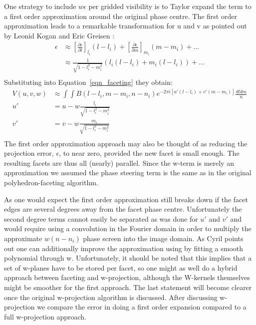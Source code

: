 One strategy to include $w\epsilon$ per gridded visibility is to Taylor expand the term to a first order approximation around the original phase centre. The 
first order approximation leads to a remarkable transformation for u and v as pointed out by Leonid Kogan and Eric Greisen \cite{aipsfaceting}:
\begin{equation}
 \begin{split}
  \epsilon&\approx \left[\frac{\partial \epsilon}{\partial l}\right]_{l_i}(l - l_i) + \left[\frac{\partial \epsilon}{\partial m}\right]_{m_i}(m - m_i) + \dots\\
  &\approx \frac{1}{\sqrt{1-l_i^2-m_i^2}}(l_i(l - l_i) + m_i(l - l_i)) + \dots\\
 \end{split}
\end{equation}
Substituting into Equation~\ref{eqn_faceting} they obtain:
\begin{equation}
 \begin{split}
  V(u,v,w)&\approx\int{\int{B(l-l_i,m-m_i,n-n_i)e^{-2{\pi}i[u'(l-l_i)+v'(m-m_i)]}\frac{dldm}{n}}}\\
  u'&=u - w\frac{l_i}{\sqrt{1-l_i^2-m_i^2}}\\
  v'&=v - w\frac{m_i}{\sqrt{1-l_i^2-m_i^2}}\\
 \end{split}
\end{equation}
The first order approximation approach may also be thought of as reducing the projection error, $\epsilon$, to near zero, provided the new facet is small enough. 
The resulting facets are thus all (nearly) parallel. Since the w-term is merely an approximation we assumed the phase steering term is the same as in the original
polyhedron-faceting algorithm.

As one would expect the first order approximation still breaks down if the facet edges are several degrees away from the facet phase centre.
Unfortunately the second degree terms cannot easily be separated as was done for $u'$ and $v'$ and would require using a convolution in the Fourier domain
in order to multiply the approximate $w(n-n_i)$ phase screen into the image domain. As Cyril \cite{tassefaceting} points out one can additionally improve the approximation
using by fitting a smooth polynomial through w. Unfortunately, it should be noted that this implies that a set of w-planes have to be stored per facet, so one might
as well do a hybrid approach between faceting and w-projection, although the W-kernels themselves might be smoother for the first approach. The last
statement will become clearer once the original w-projection algorithm is discussed. After discussing w-projection we compare the error in doing a first 
order expansion compared to a full w-projection approach. 
